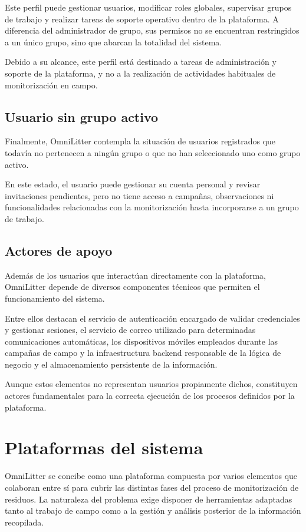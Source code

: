 Este perfil puede gestionar usuarios, modificar roles globales, supervisar grupos de trabajo y realizar tareas de soporte operativo dentro de la plataforma. A diferencia del administrador de grupo, sus permisos no se encuentran restringidos a un único grupo, sino que abarcan la totalidad del sistema.

Debido a su alcance, este perfil está destinado a tareas de administración y soporte de la plataforma, y no a la realización de actividades habituales de monitorización en campo.

\subsection{Usuario sin grupo activo}

Finalmente, OmniLitter contempla la situación de usuarios registrados que todavía no pertenecen a ningún grupo o que no han seleccionado uno como grupo activo.

En este estado, el usuario puede gestionar su cuenta personal y revisar invitaciones pendientes, pero no tiene acceso a campañas, observaciones ni funcionalidades relacionadas con la monitorización hasta incorporarse a un grupo de trabajo.

\subsection{Actores de apoyo}

Además de los usuarios que interactúan directamente con la plataforma, OmniLitter depende de diversos componentes técnicos que permiten el funcionamiento del sistema.

Entre ellos destacan el servicio de autenticación encargado de validar credenciales y gestionar sesiones, el servicio de correo utilizado para determinadas comunicaciones automáticas, los dispositivos móviles empleados durante las campañas de campo y la infraestructura backend responsable de la lógica de negocio y el almacenamiento persistente de la información.

Aunque estos elementos no representan usuarios propiamente dichos, constituyen actores fundamentales para la correcta ejecución de los procesos definidos por la plataforma.

\section{Plataformas del sistema}

OmniLitter se concibe como una plataforma compuesta por varios elementos que colaboran entre sí para cubrir las distintas fases del proceso de monitorización de residuos. La naturaleza del problema exige disponer de herramientas adaptadas tanto al trabajo de campo como a la gestión y análisis posterior de la información recopilada.

